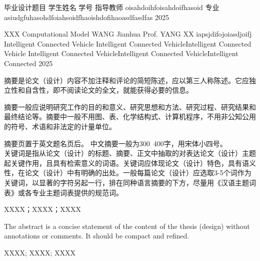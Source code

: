 \documentclass{document}
\begin{document}
\makecovercn
  {毕业设计题目}
  {学生姓名}
  {学号}
  {指导教师}
  {oisahdoihfoisahdoifhasoid}%
  {专业}
  {asiudgfuhasohdfoiahsoidfhaoishdofihaoasdfasdfas}%
  {2025}

\makecoveren
  {XXX Computational Model}
  {WANG Jianhua}
  {Prof. YANG XX}
  {iapsjdifojoiasdjoifj} %
  {Intelligent Connected Vehicle}
  {Intelligent Connected VehicleIntelligent Connected Vehicle} %
  {Intelligent Connected VehicleIntelligent Connected VehicleIntelligent Connected} %
  {2025} 

\begin{cquabstract}

摘要是论文（设计）内容不加注释和评论的简短陈述，应以第三人称陈述。它应独立性和自含性，即不阅读论文的全文，就能获得必要的信息。

摘要一般应说明研究工作的目的和意义、研究思想和方法、研究过程、研究结果和最终结论等。摘要中一般不用图、表、化学结构式、计算机程序，不用非公知公用的符号、术语和非法定的计量单位。

摘要页置于英文题名页后。 
中文摘要一般为300~400字，用宋体小四号。 \\
关键词是指从论文（设计）的标题、摘要、正文中抽取的对表达论文（设计）主题起关键作用，且具有检索意义的词语。关键词应体现论文（设计）特色，具有语义性，在论文（设计）中有明确的出处。一般每篇论文（设计）应选取3-5个词作为关键词，以显著的字符另起一行，排在同种语言摘要的下方，尽量用《汉语主题词表》或各专业主题词表提供的规范词。\\
\end{cquabstract}
  
\begin{cqukeywords}%
    XXXX；XXXX；XXXX
\end{cqukeywords}

\begin{cquabstracten}
  The abstract is a concise statement of the content of the thesis (design) without annotations or comments. It should be compact and refined.
\end{cquabstracten}

\begin{cqukeywordsen}
  XXXX; XXXX; XXXX
\end{cqukeywordsen}
  
\begin{cqucontents}

\end{cqucontents}
\end{document}
